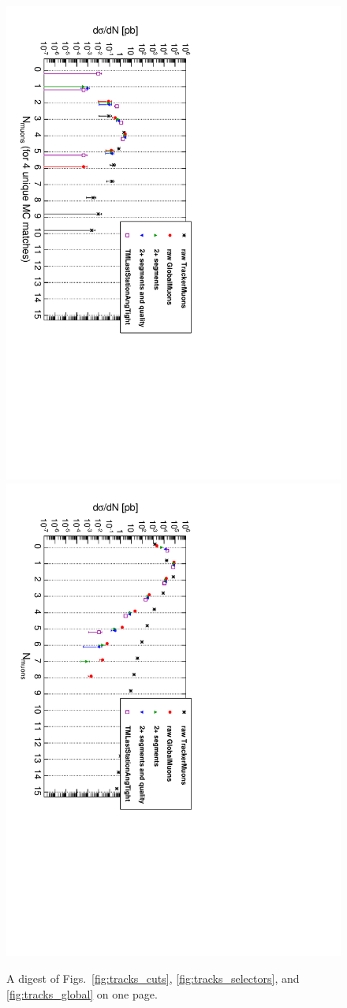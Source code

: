 \documentclass[12pt]{article}
\begin{document}
\begin{figure}[p]
\includegraphics[height=0.5\linewidth, angle=90]{fig/backgroundsMatching_plot/tracks_samepage_4real.pdf}
\includegraphics[height=0.5\linewidth, angle=90]{fig/backgroundsMatching_plot/tracks_samepage_allreal.pdf}

\caption{A digest of Figs.~\ref{fig:tracks_cuts}, \ref{fig:tracks_selectors}, and \ref{fig:tracks_global} on one page. \label{fig:tracks_samepage}}
\end{figure}

\clearpage
\end{document}
